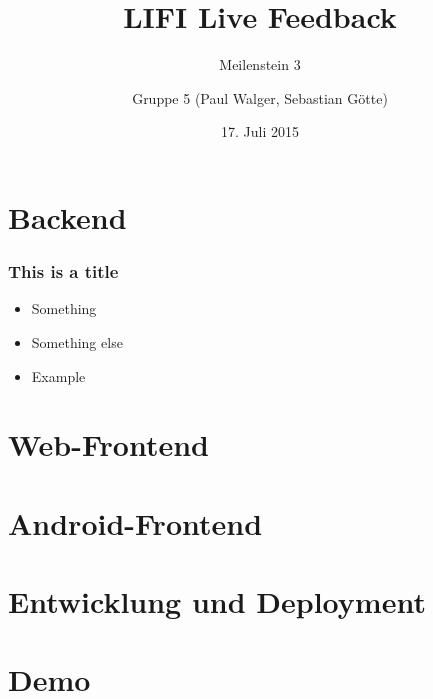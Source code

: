 \documentclass{beamer}
\title{LIFI Live Feedback}
\subtitle{Meilenstein 3}
\author{Gruppe 5 (Paul Walger, Sebastian Götte)}
\institute{TU Berlin}
\date{17. Juli 2015}
\begin{document}
\frame{\titlepage}

\section{Backend}
\begin{frame}
    \frametitle{This is a title}
    \begin{itemize}
        \item Something
        \item Something else
        \item Example
    \end{itemize}
\end{frame}

\section{Web-Frontend}
\section{Android-Frontend}
\section{Entwicklung und Deployment}
\section{Demo}
\end{document}
